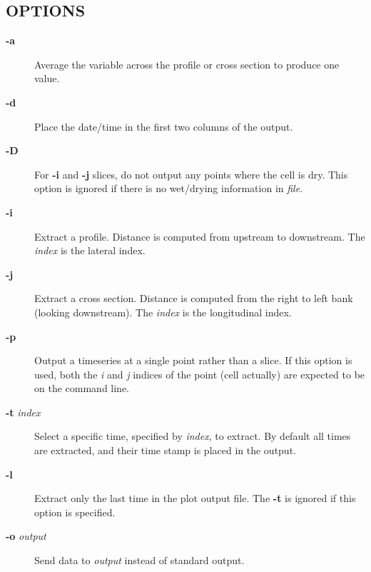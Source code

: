 \subsection*{OPTIONS\label{mass2slice_pl_OPTIONS}}\begin{description}
\item[\textbf{-a}] \mbox{}

Average the variable across the profile or cross section to produce
one value.

\item[\textbf{-d}] \mbox{}

Place the date/time in the first two columns of the output.

\item[\textbf{-D}] \mbox{}

For \textbf{-i} and \textbf{-j} slices, do not output any points where the cell is
dry.  This option is ignored if there is no wet/drying information in \textit{file}.

\item[\textbf{-i}] \mbox{}

Extract a profile.  Distance is computed from upstream to downstream.
The \textit{index} is the lateral index.

\item[\textbf{-j}] \mbox{}

Extract a cross section. Distance is computed from the right to left
bank (looking downstream). The \textit{index} is the longitudinal index.

\item[\textbf{-p}] \mbox{}

Output a timeseries at a single point rather than a slice.  If this
option is used, both the \textit{i} and \textit{j} indices of the point (cell
actually) are expected to be on the command line.

\item[\textbf{-t} \textit{index}] \mbox{}

Select a specific time, specified by \textit{index}, to extract.  By default
all times are extracted, and their time stamp is placed in the output.

\item[\textbf{-l}] \mbox{}

Extract only the last time in the plot output file.  The \textbf{-t} is
ignored if this option is specified.

\item[\textbf{-o} \textit{output}] \mbox{}

Send data to \textit{output} instead of standard output.

\end{description}
